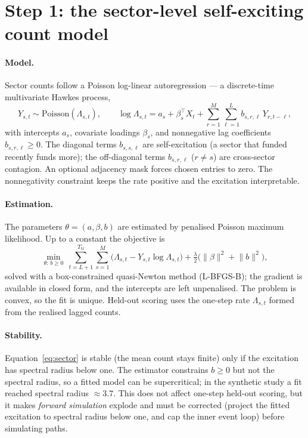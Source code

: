 \documentclass[11pt]{article}
\begin{document}
\section{Step 1: the sector-level self-exciting count model}
\label{sec:step1}

\paragraph{Model.} Sector counts follow a Poisson log-linear autoregression --- a
discrete-time multivariate Hawkes process,
\begin{equation}
Y_{s,t}\sim\mathrm{Poisson}(\Lambda_{s,t}),\qquad
\log\Lambda_{s,t}=a_s+\beta_s^\top X_t+\sum_{r=1}^{M}\sum_{\ell=1}^{L}b_{s,r,\ell}\,Y_{r,t-\ell},
\label{eq:sector}
\end{equation}
with intercepts $a_s$, covariate loadings $\beta_s$, and nonnegative lag coefficients
$b_{s,r,\ell}\ge 0$. The diagonal terms $b_{s,s,\ell}$ are self-excitation (a sector that
funded recently funds more); the off-diagonal terms $b_{s,r,\ell}$ ($r\neq s$) are
cross-sector contagion. An optional adjacency mask forces chosen entries to zero. The
nonnegativity constraint keeps the rate positive and the excitation interpretable.

\paragraph{Estimation.} The parameters $\theta=(a,\beta,b)$ are estimated by penalised
Poisson maximum likelihood. Up to a constant the objective is
\begin{equation}
\min_{\theta:\,b\ge 0}\ \sum_{t=L+1}^{T_{\mathrm{tr}}}\sum_{s=1}^{M}
\big(\Lambda_{s,t}-Y_{s,t}\log\Lambda_{s,t}\big)
+\tfrac{\lambda}{2}\big(\lVert\beta\rVert^2+\lVert b\rVert^2\big),
\label{eq:sectorfit}
\end{equation}
solved with a box-constrained quasi-Newton method (L-BFGS-B); the gradient is available
in closed form, and the intercepts are left unpenalised. The problem is convex, so the
fit is unique. Held-out scoring uses the one-step rate
$\Lambda_{s,t}$ formed from the realised lagged counts.

\paragraph{Stability.} Equation~\eqref{eq:sector} is stable (the mean count stays
finite) only if the excitation has spectral radius below one. The estimator constrains
$b\ge 0$ but not the spectral radius, so a fitted model can be supercritical; in the
synthetic study a fit reached spectral radius $\approx 3.7$. This does not affect
one-step held-out scoring, but it makes \emph{forward simulation} explode and must be
corrected (project the fitted excitation to spectral radius below one, and cap the inner
event loop) before simulating paths.
\end{document}
